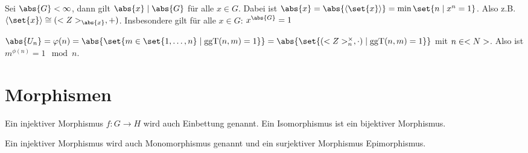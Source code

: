 \begin{conclusion}
	Sei $\abs{G} < \infty$, dann gilt $\abs{x} \mid \abs{G}$ für alle $x \in G$. Dabei ist $\abs{x} = \abs{\langle \set{x}\rangle} = \min\set{n \mid x^n = 1}$. Also z.B. $\langle \set{x} \rangle \cong (\Z_{\abs{x}},+)$. Insbesondere gilt für alle $x \in G$:  $x^{\abs{G}} = 1$
\end{conclusion}

\begin{conclusion}
	$\abs{U_n} = \phi(n) = \abs{\set{m \in \set{1, \dots,n} \mid \ggT(n,m) = 1}} = \abs{\set{(\Z_n^{\times}, \cdot) \mid \ggT(n,m) = 1}}$ mit $n \in <N>$. Also ist $m^{\phi(n)} = 1 \mod n$.
\end{conclusion}

\section{Morphismen}
\begin{definition}
	Ein injektiver Morphismus $f\colon G \to H$ wird auch Einbettung genannt. Ein Isomorphismus ist ein bijektiver Morphismus.
\end{definition}

\begin{*remark}
	Ein injektiver Morphismus wird auch Monomorphismus genannt und ein surjektiver Morphismus Epimorphismus.
\end{*remark}

